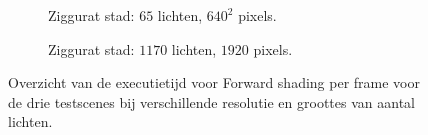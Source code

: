 \begin{figure}[p]
\begin{adjustbox}{minipage=\textwidth, scale=0.6}
\begin{subfigure}[b]{0.83\textwidth}
      \caption{Ziggurat stad: $65$ lichten, $640^2$ pixels.}
      \label{fig:ts-frames-forward:city-low}
    \end{subfigure}
  \end{adjustbox} %
  \begin{adjustbox}{minipage=\textwidth, scale=0.6}
    \begin{subfigure}[b]{0.83\textwidth}
      \centering
      \def\svgwidth{\textwidth}
      
      \caption{Ziggurat stad: $1170$ lichten, $1920$ pixels.}
      \label{fig:ts-frames-forward:city-high}
    \end{subfigure}
  \end{adjustbox}
  \caption{Overzicht van de executietijd voor Forward shading per frame voor de
           drie testscenes bij verschillende resolutie en groottes van aantal
           lichten.}
  \label{fig:ts-frames-forward}
\end{figure}

